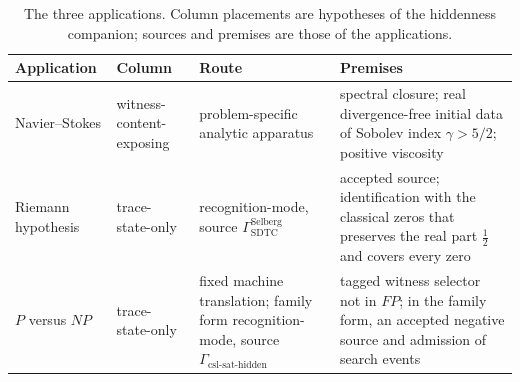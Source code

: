 \begin{table}[H]
  \centering
  \caption{The three applications.  Column placements are hypotheses of
  the hiddenness companion; sources and premises are those of the
  applications.}
  \label{tab:cross-track-validation}
  \small
  \renewcommand{\arraystretch}{1.1}
  \begin{tabularx}{\textwidth}{@{}>{\raggedright\arraybackslash}p{}>{\raggedright\arraybackslash}p{}>{\raggedright\arraybackslash}p{}>{\raggedright\arraybackslash}X@{}}
    \toprule
    Application & Column & Route & Premises \\
    \midrule
    Navier--Stokes & witness-content-exposing & problem-specific analytic apparatus & spectral closure; real divergence-free initial data of Sobolev index \(\gamma>5/2\); positive viscosity \\
    Riemann hypothesis & trace-state-only & recognition-mode, source \(\Gamma_{\mathrm{SDTC}}^{\mathrm{Selberg}}\) & accepted source; identification with the classical zeros that preserves the real part \(\frac12\) and covers every zero \\
    \(P\) versus \(NP\) & trace-state-only & fixed machine translation; family form recognition-mode, source \(\Gamma_{\mathrm{csl\text{-}sat\text{-}hidden}}\) & tagged witness selector not in \(FP\); in the family form, an accepted negative source and admission of search events \\
    \bottomrule
  \end{tabularx}
\end{table}
